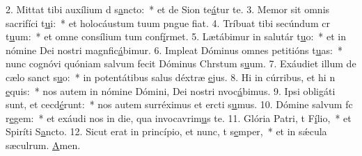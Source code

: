 2. Mittat tibi auxílium d s\uline{a}ncto:~* et de Sion te\uline{á}tur te.
3. Memor sit omnis sacrifíci t\uline{u}i:~* et holocáustum tuum pngue f\uline{i}at.
4. Tríbuat tibi secúndum cr t\uline{u}um:~* et omne consílium tum conf\uline{í}rmet.
5. Lætábimur in salutár t\uline{u}o:~* et in nómine Dei nostri magnfic\uline{á}bimur.
6. Impleat Dóminus omnes petitións t\uline{u}as:~* nunc cognóvi quóniam salvum fecit Dóminus Chrstum s\uline{u}um.
7. Exáudiet illum de cælo sanct s\uline{u}o:~* in potentátibus salus déxtræ \uline{e}jus.
8. Hi in cúrribus, et hi n \uline{e}quis:~* nos autem in nómine Dómini, Dei nostri nvoc\uline{á}bimus.
9. Ipsi obligáti sunt, et cecd\uline{é}runt:~* nos autem surréximus et ercti s\uline{u}mus.
10. Dómine salvum fc r\uline{e}gem:~* et exáudi nos in die, qua invocavrim\uline{u}s te.
11. Glória Patri, t F\uline{í}lio,~* et Spiríti S\uline{a}ncto.
12. Sicut erat in princípio, et nunc, t s\uline{e}mper,~* et in sǽcula sæculrum. \uline{A}men.
